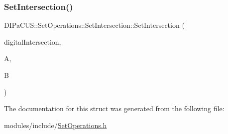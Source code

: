 \subsubsection{\texorpdfstring{Set\+Intersection()}{SetIntersection()}}
{\footnotesize\ttfamily D\+I\+Pa\+C\+U\+S\+::\+Set\+Operations\+::\+Set\+Intersection\+::\+Set\+Intersection (\begin{DoxyParamCaption}\item[{\mbox{\hyperlink{structDIPaCUS_1_1SetOperations_1_1SetIntersection_a30ae8d2238ec7e463abf64bba651e28f}{Digital\+Set}} \&}]{digital\+Intersection,  }\item[{const \mbox{\hyperlink{structDIPaCUS_1_1SetOperations_1_1SetIntersection_a30ae8d2238ec7e463abf64bba651e28f}{Digital\+Set}} \&}]{A,  }\item[{const \mbox{\hyperlink{structDIPaCUS_1_1SetOperations_1_1SetIntersection_a30ae8d2238ec7e463abf64bba651e28f}{Digital\+Set}} \&}]{B }\end{DoxyParamCaption})\hspace{0.3cm}{\ttfamily [inline]}}



The documentation for this struct was generated from the following file\+:\begin{DoxyCompactItemize}
\item 
modules/include/\mbox{\hyperlink{SetOperations_8h}{Set\+Operations.\+h}}\end{DoxyCompactItemize}

